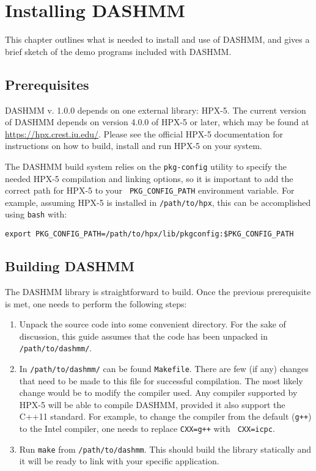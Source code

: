 \chapter{Installing DASHMM}
\label{ch:install}

This chapter outlines what is needed to install and use of DASHMM, and
gives a brief sketch of the demo programs included with DASHMM.

\section{Prerequisites}

DASHMM v. 1.0.0 depends on one external library: HPX-5. The current
version of DASHMM depends on version 4.0.0 of HPX-5 or later, which
may be found at \url{https://hpx.crest.iu.edu/}. Please see the
official HPX-5 documentation for instructions on how to build, install
and run HPX-5 on your system.

The DASHMM build system relies on the {\tt pkg-config} utility to
specify the needed HPX-5 compilation and linking options, so it is
important to add the correct path for HPX-5 to your {\tt
  PKG\_CONFIG\_PATH} environment variable. For example, assuming HPX-5
is installed in {\tt /path/to/hpx}, this can be accomplished using
{\tt bash} with:

\begin{verbatim}
export PKG_CONFIG_PATH=/path/to/hpx/lib/pkgconfig:$PKG_CONFIG_PATH
\end{verbatim}

\section{Building DASHMM}

The DASHMM library is straightforward to build. Once the previous
prerequisite is met, one needs to perform the following steps:

\begin{enumerate}
\item Unpack the source code into some convenient directory. For the
  sake of discussion, this guide assumes that the code has been
  unpacked in {\tt /path/to/dashmm/}.
\item In {\tt /path/to/dashmm/} can be found {\tt Makefile}. There are
  few (if any) changes that need to be made to this file for
  successful compilation. The most likely change would be to modify
  the compiler used. Any compiler supported by HPX-5 will be able to
  compile DASHMM, provided it also support the C++11 standard. For
  example, to change the compiler from the default ({\tt g++}) to the
  Intel compiler, one needs to replace {\tt CXX=g++} with {\tt
    CXX=icpc}.
\item Run {\tt make} from {\tt /path/to/dashmm}. This should build the
  library statically and it will be ready to link with your specific
  application.
\end{enumerate}

